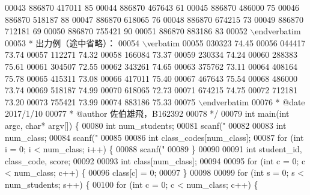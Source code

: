 \begin{DoxyCode}
{00043 \textcolor{comment}{886870 417011 85}
00044 \textcolor{comment}{886870 467643 61}
00045 \textcolor{comment}{886870 486000 75}
00046 \textcolor{comment}{886870 518187 88}
00047 \textcolor{comment}{886870 618065 76}
00048 \textcolor{comment}{886870 674215 73}
00049 \textcolor{comment}{886870 712181 69}
00050 \textcolor{comment}{886870 755421 90}
00051 \textcolor{comment}{886870 883186 83}
00052 \textcolor{comment}{\(\backslash\)endverbatim}
00053 \textcolor{comment}{  *  出力例（途中省略）：}
00054 \textcolor{comment}{\(\backslash\)verbatim}
00055 \textcolor{comment}{030323 74.45}
00056 \textcolor{comment}{044417 73.74}
00057 \textcolor{comment}{112271 74.32}
00058 \textcolor{comment}{166084 73.37}
00059 \textcolor{comment}{230334 74.24}
00060 \textcolor{comment}{288383 75.61}
00061 \textcolor{comment}{304507 72.55}
00062 \textcolor{comment}{343261 74.65}
00063 \textcolor{comment}{375762 73.11}
00064 \textcolor{comment}{408164 75.78}
00065 \textcolor{comment}{415311 73.08}
00066 \textcolor{comment}{417011 75.40}
00067 \textcolor{comment}{467643 75.54}
00068 \textcolor{comment}{486000 73.74}
00069 \textcolor{comment}{518187 74.99}
00070 \textcolor{comment}{618065 72.73}
00071 \textcolor{comment}{674215 74.75}
00072 \textcolor{comment}{712181 73.20}
00073 \textcolor{comment}{755421 73.99}
00074 \textcolor{comment}{883186 75.33}
00075 \textcolor{comment}{\(\backslash\)endverbatim}
00076 \textcolor{comment}{ *  @date   2017/1/10}
00077 \textcolor{comment}{ *  @author 佐伯雄飛，B162392}
00078 \textcolor{comment}{ */}
00079 \textcolor{keywordtype}{int} main(\textcolor{keywordtype}{int} argc, \textcolor{keywordtype}{char}* argv[]) \{
00080   \textcolor{keywordtype}{int} num\_students;
00081   scanf(\textcolor{stringliteral}{"%
00082 
00083   \textcolor{keywordtype}{int} num\_class;
00084   scanf(\textcolor{stringliteral}{"%
00085 
00086   \textcolor{keywordtype}{int} class\_codes[num\_class];
00087   \textcolor{keywordflow}{for} (\textcolor{keywordtype}{int} i = 0; i < num\_class; i++) \{
00088     scanf(\textcolor{stringliteral}{"%
00089   \}
00090 
00091   \textcolor{keywordtype}{int} student\_id, class\_code, score;
00092 
00093   \textcolor{keywordtype}{int} \textcolor{keyword}{class}[num\_class];
00094 
00095   \textcolor{keywordflow}{for} (\textcolor{keywordtype}{int} c = 0; c < num\_class; c++) \{
00096     \textcolor{keyword}{class}[c] = 0;
00097   \}
00098 
00099   \textcolor{keywordflow}{for} (\textcolor{keywordtype}{int} s = 0; s < num\_students; s++) \{
00100     \textcolor{keywordflow}{for} (\textcolor{keywordtype}{int} c = 0; c < num\_class; c++) \{
}}}}
\end{DoxyCode}
